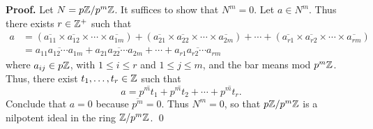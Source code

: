 \begin{enumerate}
      \textbf{Proof.} Let $N = p\mathbb{Z}/p^m\mathbb{Z}$. It suffices to show that $N^m = 0$.
      Let $a \in N^m$. Thus there exists $r \in \mathbb{Z}^+$ such that
      \begin{align*} a &= (\overline{a_{11}}\times\overline{a_{12}}
            \times\cdots\times\overline{a_{1m}}) +
            (\overline{a_{21}}\times\overline{a_{22}}
            \times\cdots\times\overline{a_{2m}}) + \cdots +
            (\overline{a_{r1}}\times\overline{a_{r2}}
            \times\cdots\times\overline{a_{rm}}) \\
         &= \overline{a_{11}{a_{12}}\cdots a_{1m}} +
            \overline{a_{21}{a_{22}}\cdots a_{2m}} + \cdots +
            \overline{a_{r1}{a_{r2}}\cdots a_{rm}}
      \end{align*}
      where $a_{ij} \in p\mathbb{Z}$, with $1 \le i \le r$ and $1 \le j \le m$, and the
      bar means mod $p^m\mathbb{Z}$. Thus, there exist $t_1, \ldots, t_r \in \mathbb{Z}$ such
      that
      $$a = \overline{p^mt_1} + \overline{p^mt_2} + \cdots +
            \overline{p^mt_r}.$$
      Conclude that $a = 0$ because $\overline{p^m} = 0$. Thus $N^m = 0$, so
      that $p\mathbb{Z}/p^m\mathbb{Z}$ is a nilpotent ideal in the ring $\mathbb{Z}/p^m\mathbb{Z}$. \qed
\end{enumerate}
